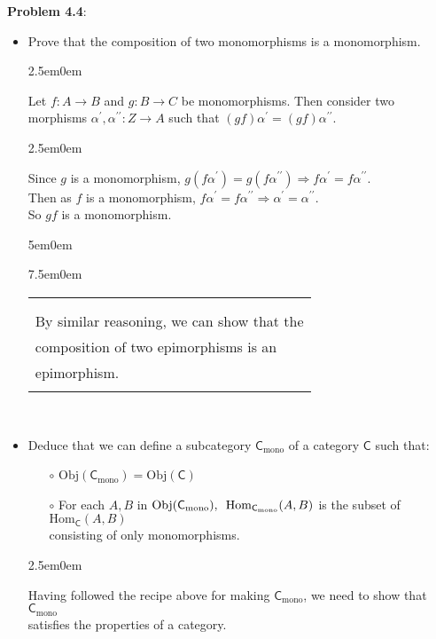 \documentclass{book}
\newcommand{\pracTwo}{
   \color{Orange}%
   \fontsize{12}{14}\selectfont%
}
\newenvironment{myIndent}{%
   \begin{adjustwidth}{2.5em}{0em}%
}{%
   \end{adjustwidth}%
}
\newenvironment{myDindent}{%
   \begin{adjustwidth}{5em}{0em}%
}{%
   \end{adjustwidth}%
}
\newenvironment{myTindent}{%
   \begin{adjustwidth}{7.5em}{0em}%
}{%
   \end{adjustwidth}%
}
\newcommand{\pprime}{{\prime\prime}}
\newcommand{\myHS}{ \hspace{0.5em}}
\newcommand{\myObj}{\mathrm{Obj}}
\newcommand{\myHom}{\mathrm{Hom}}
\newcommand{\mcateg}[1]{\mathsf{#1}}
\newenvironment{myClosureOne}[2][.]{%
   \color{#1}%
   \begin{tabular}{|p{#2in}|} \hline \\%
}{%
   \\ \hline \end{tabular}%
}
\newcommand{\retTwo}{\hfill\bigbreak}
\begin{document}
\textbf{Problem 4.4}:
\begin{itemize}
   \item Prove that the composition of two monomorphisms is a monomorphism.
   {\begin{myIndent}\pracTwo
      Let $f: A \longrightarrow B$ and $g: B \longrightarrow C$ be monomorphisms. Then consider two\\ morphisms $\alpha^\prime, \alpha^\pprime: Z \longrightarrow A$ such that $(gf)\alpha^\prime = (gf)\alpha^\pprime$.
      \begin{myIndent}
         Since $g$ is a monomorphism, $g(f\alpha^\prime) = g(f\alpha^\pprime) \Longrightarrow f\alpha^\prime = f\alpha^\pprime$.\\
         Then as $f$ is a monomorphism, $f\alpha^\prime = f\alpha^\pprime \Longrightarrow \alpha^\prime = \alpha^\pprime$.\\
         So $gf$ is a monomorphism.
      \end{myIndent}
      \begin{myDindent}\begin{myTindent}
         \begin{myClosureOne}{3.35}
            \\ [-22pt] By similar reasoning, we can show that the\\ composition of two epimorphisms is an\\ epimorphism.\\ [-10pt]
         \end{myClosureOne}\\
      \end{myTindent}\end{myDindent}
   \end{myIndent}}

   \item Deduce that we can define a subcategory $\mcateg{C}_{\mathrm{mono}}$ of a category $\mcateg{C}$ such that:
   \begin{itemize}
      \item[$\circ$] $\myObj(\mcateg{C_{\mathrm{mono}}}) = \myObj(\mcateg{C})$
      \item[$\circ$] For each $A, B$ in $\myObj(\mcateg{C_{\mathrm{mono}}}), \myHS \myHom_{\mcateg{C_{\mathrm{mono}}}}(A, B)$ is the subset of $\myHom_{\mcateg{C}}(A, B)$\\ consisting of only monomorphisms.
   \end{itemize}

   {\begin{myIndent}\pracTwo
      Having followed the recipe above for making $\mcateg{C}_{\mathrm{mono}}$, we need to show that $\mcateg{C}_{\mathrm{mono}}$\\ satisfies the properties of a category.\retTwo


\end{myIndent}}
\end{itemize}
\end{document}
